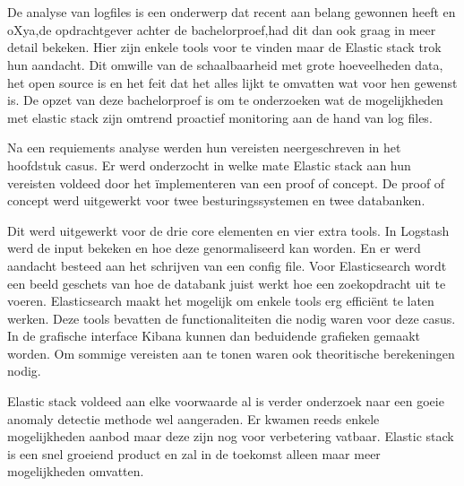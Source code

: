 


\chapter*{}

De analyse van logfiles is een onderwerp dat recent aan belang gewonnen heeft en oXya,de opdrachtgever achter de bachelorproef,had dit dan ook graag in meer detail bekeken. Hier zijn enkele tools voor te vinden maar de Elastic stack trok hun aandacht. Dit omwille van de schaalbaarheid met grote hoeveelheden data, het open source is en het feit dat het alles lijkt te omvatten wat voor hen gewenst is. De opzet van deze bachelorproef is om te onderzoeken wat de mogelijkheden met elastic stack zijn omtrend proactief monitoring aan de hand van log files. 

Na een requiements analyse werden hun vereisten neergeschreven in het hoofdstuk casus.
Er werd onderzocht in welke mate Elastic stack aan hun vereisten voldeed door het ïmplementeren van een proof of concept. De proof of concept werd uitgewerkt voor twee besturingssystemen en twee databanken.

Dit werd uitgewerkt voor de drie core elementen en vier extra tools. In Logstash werd de input bekeken en hoe deze genormaliseerd kan worden. En er werd aandacht besteed aan het schrijven van een config file. Voor Elasticsearch wordt een beeld geschets van hoe de databank juist werkt hoe een zoekopdracht uit te voeren. Elasticsearch maakt het mogelijk om enkele tools erg efficiënt te laten werken. Deze tools bevatten de functionaliteiten die nodig waren voor deze casus. In de grafische interface Kibana kunnen dan beduidende grafieken gemaakt worden.
Om sommige vereisten aan te tonen waren ook theoritische berekeningen nodig.

Elastic stack voldeed aan elke voorwaarde al is verder onderzoek naar een goeie anomaly detectie methode wel aangeraden. Er kwamen reeds enkele mogelijkheden aanbod maar deze zijn nog voor verbetering vatbaar.
Elastic stack is een snel groeiend product en zal in de toekomst alleen maar meer mogelijkheden omvatten.